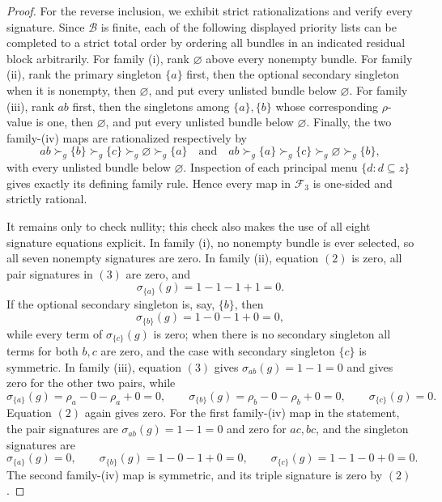 \documentclass{article}
\begin{document}
\begin{proof}
For the reverse inclusion, we exhibit strict rationalizations and
verify every signature.  Since \(\mathcal B\) is finite, each of the
following displayed priority lists can be completed to a strict total
order by ordering all bundles in an indicated residual block
arbitrarily.  For family (i), rank \(\varnothing\) above every
nonempty bundle.  For family (ii), rank the primary singleton
\(\{a\}\) first, then the optional secondary singleton when it is
nonempty, then \(\varnothing\), and put every unlisted bundle below
\(\varnothing\).  For family (iii), rank \(ab\) first, then the
singletons among \(\{a\},\{b\}\) whose corresponding
\(\rho\)-value is one, then \(\varnothing\), and put every unlisted
bundle below \(\varnothing\).  Finally, the two family-(iv) maps are
rationalized respectively by
\[
ab\succ_g\{b\}\succ_g\{c\}\succ_g\varnothing\succ_g\{a\}
\quad\text{and}\quad
ab\succ_g\{a\}\succ_g\{c\}\succ_g\varnothing\succ_g\{b\},
\tag{17}
\]
with every unlisted bundle below \(\varnothing\).  Inspection of each
principal menu \(\{d:d\subseteq z\}\) gives exactly its defining
family rule.  Hence every map in \(\mathcal F_3\) is one-sided and
strictly rational.

It remains only to check nullity; this check also makes the use of all
eight signature equations explicit.  In family (i), no nonempty
bundle is ever selected, so all seven nonempty signatures are zero.
In family (ii), equation \((2)\) is zero, all pair signatures in
\((3)\) are zero, and
\[
\sigma_{\{a\}}(g)=1-1-1+1=0. \tag{18}
\]
If the optional secondary singleton is, say, \(\{b\}\), then
\[
\sigma_{\{b\}}(g)=1-0-1+0=0, \tag{19}
\]
while every term of \(\sigma_{\{c\}}(g)\) is zero; when there is no
secondary singleton all terms for both \(b,c\) are zero, and the
case with secondary singleton \(\{c\}\) is symmetric.  In family
(iii), equation \((3)\) gives
\(\sigma_{ab}(g)=1-1=0\) and gives zero for the other two pairs,
while
\[
\sigma_{\{a\}}(g)=\rho_a-0-\rho_a+0=0,
\qquad
\sigma_{\{b\}}(g)=\rho_b-0-\rho_b+0=0,
\qquad
\sigma_{\{c\}}(g)=0. \tag{20}
\]
Equation \((2)\) again gives zero.  For the first family-(iv) map in
the statement, the pair signatures are
\(\sigma_{ab}(g)=1-1=0\) and zero for \(ac,bc\), and the singleton
signatures are
\[
\sigma_{\{a\}}(g)=0,
\qquad
\sigma_{\{b\}}(g)=1-0-1+0=0,
\qquad
\sigma_{\{c\}}(g)=1-1-0+0=0. \tag{21}
\]
The second family-(iv) map is symmetric, and its triple signature is
zero by \((2)\).


\end{proof}
\end{document}
